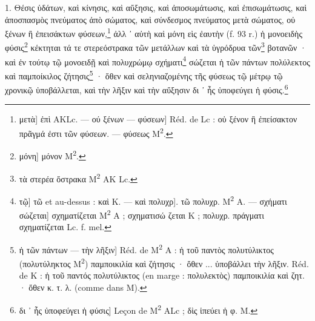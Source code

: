 \documentclass[a4paper, 11pt, oneside, polutonikogreek, french]{article}
\begin{document}
\bigskip

1. Θέσις ὑδάτων, καὶ κίνησις, καὶ αὔξησις, καὶ ἀποσωμάτωσις, καὶ ἐπισωμάτωσις, καὶ ἀποσπασμὸς πνεύματος ἀπὸ σώματος, καὶ σύνδεσμος πνεύματος μετὰ σώματος, οὐ ξένων ἢ ἐπεισάκτων φύσεων,\footnote{μετὰ] ἐπὶ AKLc. --- ού ξένων --- φύσεων] Réd. de Lc : οὐ ξένον ἢ ἐπείσακτον πρᾶγμά ἐστι τῶν φύσεων. --- φύσεως M\textsuperscript{2}.} ἀλλ ᾽ αὐτὴ καὶ μόνη εὶς ἐαυτὴν (f. 93 r.) ἡ μονοειδὴς φύσις\footnote{μόνη] μόνον M\textsuperscript{2}.} κέκτηται τά τε στερεόστρακα τῶν μετάλλων καὶ τὰ ὑγρόδρυα τῶν\footnote{τὰ στερέα ὄστρακα M\textsuperscript{2} AK Lc.} βοτανῶν · καὶ ἐν τούτῳ τῷ μονοειδῇ καὶ πολυχρώμῳ σχήματι\footnote{τῷ] τῶ et au-dessus : καὶ K. --- καὶ πολυχρ]. τῶ πολυχρ. M\textsuperscript{2} A. --- σχήματι σώζεται] σχηματίζεται M\textsuperscript{2} A ; σχηματισώ ζεται K ; πολυχρ. πράγματι σχηματίζεται Lc. f. mel.} σώζεται ἡ τῶν πάντων πολύλεκτος καὶ παμποίκιλος ζήτησις\footnote{ἡ τῶν πάντων --- τὴν λῆξιν] Réd. de M\textsuperscript{2} A : ἡ τοῦ παντὸς πολυτύλικτος (πολυτύληκτος M\textsuperscript{2}) παμποικιλία καὶ ζήτησις · ὄθεν ... ὑποβάλλει τὴν λῆξιν. Réd. de K : ἡ τοῦ παντός πολυτύλικτος (en marge : πολυλεκτὸς) παμποικιλία καὶ ζητ. · ὄθεν κ. τ. λ. (comme dans M).} · ὅθεν καὶ σεληνιαζομένης τῆς φύσεως τῷ μέτρῳ τῷ χρονικῷ ὑποβάλλεται, καὶ τὴν λῆξιν καὶ τὴν αὔξησιν δι ᾽ ἦς ὑποφεύγει ἡ φύσις.\footnote{δι ᾽ ἧς ὑποφεύγει ἡ φύσις] Leçon de M\textsuperscript{2} ALc ; δὶς ἱπεύει ἡ φ. M.}
\end{document}
